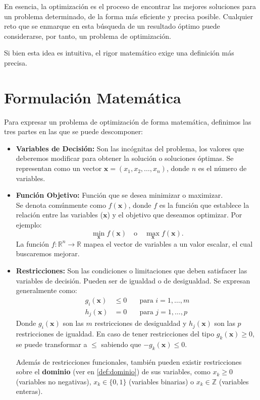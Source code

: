 \documentclass[12pt,a4paper]{book}
\begin{document}
En esencia, la optimización es el proceso de encontrar las mejores soluciones para un problema determinado, de la forma más eficiente y precisa posible.
Cualquier reto que se enmarque en esta búsqueda de un resultado óptimo puede considerarse, por tanto, un problema de optimización.

Si bien esta idea es intuitiva, el rigor matemático exige una definición más precisa.

\section{Formulación Matemática}

Para expresar un problema de optimización de forma matemática, definimos las tres partes en las que se puede descomponer:

\begin{itemize}
    \item \textbf{Variables de Decisión:} Son las incógnitas del problema, los valores que deberemos modificar para obtener la solución o soluciones óptimas. Se representan como un vector $\mathbf{x} = (x_1, x_2, \ldots, x_n)$, donde $n$ es el número de variables.

    \item \textbf{Función Objetivo:} Función que se desea minimizar o maximizar.\\
    Se denota comúnmente como $f(\mathbf{x})$, donde $f$ es la función que establece la relación entre las variables ($\mathbf{x}$) y el objetivo que deseamos optimizar.
    Por ejemplo:
    $$ \min_{\mathbf{x}} f(\mathbf{x}) \quad \text{o} \quad \max_{\mathbf{x}} f(\mathbf{x}) .$$
    La función $f: \mathbb{R}^n \to \mathbb{R}$ mapea el vector de variables a un valor escalar, el cual buscaremos mejorar.

    \item \textbf{Restricciones:} Son las condiciones o limitaciones que deben satisfacer las variables de decisión. Pueden ser de igualdad o de desigualdad. Se expresan generalmente como:
    \begin{align*}
        g_i(\mathbf{x}) &\le 0 & \quad \text{para } i = 1, \ldots, m \\
        h_j(\mathbf{x}) &= 0 & \quad \text{para } j = 1, \ldots, p
    \end{align*}
    Donde $g_i(\mathbf{x})$ son las $m$ restricciones de desigualdad y $h_j(\mathbf{x})$ son las $p$ restricciones de igualdad.
    En caso de tener restricciones del tipo $g_k(\mathbf{x})\geq0$, se puede transformar a $\leq$ sabiendo que $-g_k(\mathbf{x}) \leq 0$.
    
    Además de restricciones funcionales, también pueden existir restricciones sobre el \textbf{dominio} (ver en \ref{def:dominio}) de sus variables, como $x_k \ge 0$ (variables no negativas),  $x_k \in \{0,1\}$ (variables binarias) o $x_k \in \mathbb{Z}$ (variables enteras).
\end{itemize}
\end{document}

